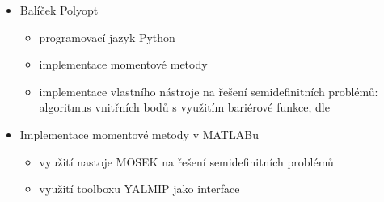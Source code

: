 \documentclass[cmpiitalkstyle, 22pt]{cmptalk}
\begin{document}
\begin{cmptalkslide}[Implementace]
  \begin{itemize}
    \item Balíček Polyopt
    \begin{itemize}
      \item programovací jazyk Python
      \item implementace momentové metody
      \item implementace vlastního nástroje na řešení semidefinitních problémů: algoritmus vnitřních bodů s využitím bariérové funkce, dle \cite{Nesterov-2004}
    \end{itemize}
    \item Implementace momentové metody v MATLABu
    \begin{itemize}
      \item využití nastoje MOSEK \cite{mosek} na řešení semidefinitních problémů
      \item využití toolboxu YALMIP \cite{Yalmip} jako interface
    \end{itemize}
  \end{itemize}


\end{cmptalkslide}
\end{document}
